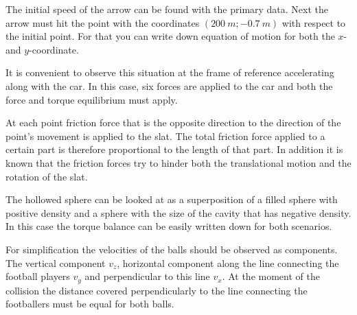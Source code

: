 \documentclass[11pt]{article}
\begin{document}

\hinteng
The initial speed of the arrow can be found with the primary data. Next the arrow must hit the point with the coordinates $(\SI{200}{m};\SI{-0,7}{m})$ with respect to the initial point. For that you can write down equation of motion for both the $x$- and $y$-coordinate.
\probend
\bigskip


\hinteng
It is convenient to observe this situation at the frame of reference accelerating along with the car. In this case, six forces are applied to the car and both the force and torque equilibrium must apply.
\probend
\bigskip


\hinteng
At each point friction force that is the opposite direction to the direction of the point’s movement is applied to the slat. The total friction force applied to a certain part is therefore proportional to the length of that part. In addition it is known that the friction forces try to hinder both the translational motion and the rotation of the slat.
\probend
\bigskip


\hinteng
The hollowed sphere can be looked at as a superposition of a filled sphere with positive density and a sphere with the size of the cavity that has negative density. In this case the torque balance can be easily written down for both scenarios.
\probend
\bigskip


\hinteng
For simplification the velocities of the balls should be observed as components. The vertical component $v_z$, horizontal component along the line connecting the football players $v_y$ and perpendicular to this line $v_x$. At the moment of the collision the distance covered perpendicularly to the line connecting the footballers must be equal for both balls.
\probend
\bigskip
\end{document}
